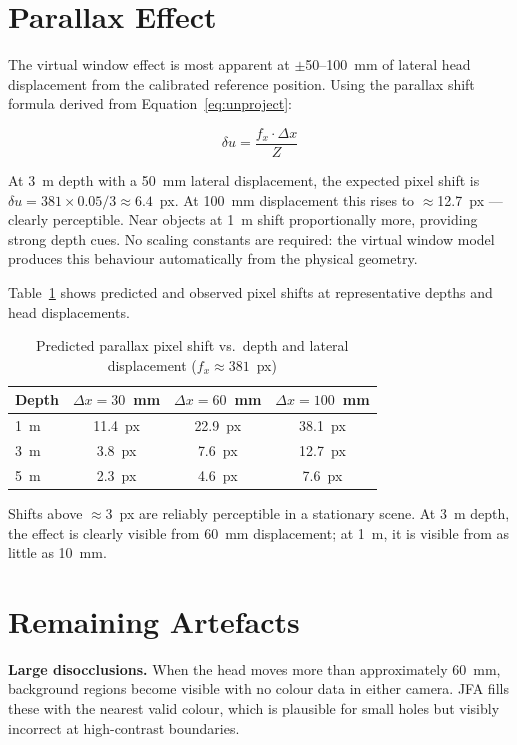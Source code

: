 \documentclass[11pt, a4paper]{report}
\begin{document}
\section{Parallax Effect}

The virtual window effect is most apparent at $\pm$50--100~mm of lateral
head displacement from the calibrated reference position.
Using the parallax shift formula derived from Equation~\ref{eq:unproject}:

\begin{equation}
    \delta u = \frac{f_x \cdot \Delta x}{Z}
\end{equation}

At 3~m depth with a 50~mm lateral displacement, the expected pixel shift
is $\delta u = 381 \times 0.05 / 3 \approx 6.4$~px.
At 100~mm displacement this rises to $\approx$12.7~px --- clearly
perceptible.
Near objects at 1~m shift proportionally more, providing strong depth cues.
No scaling constants are required: the virtual window model produces this
behaviour automatically from the physical geometry.

Table~\ref{tab:parallax_shift} shows predicted and observed pixel shifts
at representative depths and head displacements.

\begin{table}[h]
\centering
\caption{Predicted parallax pixel shift vs.\ depth and lateral displacement
         ($f_x \approx 381$~px)}
\label{tab:parallax_shift}
\begin{tabular}{@{}lccc@{}}
\toprule
Depth & $\Delta x = 30$~mm & $\Delta x = 60$~mm & $\Delta x = 100$~mm \\
\midrule
1~m  & 11.4~px & 22.9~px & 38.1~px \\
3~m  & 3.8~px  & 7.6~px  & 12.7~px \\
5~m  & 2.3~px  & 4.6~px  & 7.6~px  \\
\bottomrule
\end{tabular}
\end{table}

Shifts above $\approx$3~px are reliably perceptible in a stationary
scene.
At 3~m depth, the effect is clearly visible from 60~mm displacement; at
1~m, it is visible from as little as 10~mm.

\section{Remaining Artefacts}

\textbf{Large disocclusions.}
When the head moves more than approximately 60~mm, background regions
become visible with no colour data in either camera.
JFA fills these with the nearest valid colour, which is plausible for
small holes but visibly incorrect at high-contrast boundaries.
\end{document}
